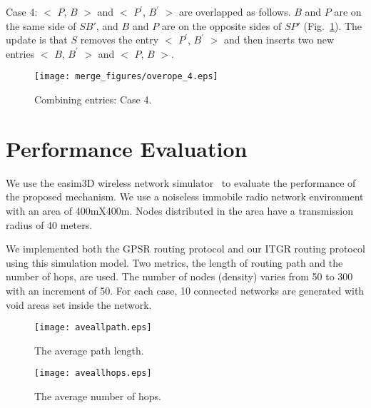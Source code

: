 \documentclass[3p,times]{elsarticle}
\begin{document}
Case 4: $<$ $P$, $B$ $>$ and $<$ $P^{'}$, $B^{'}$ $>$ are overlapped as follows. $B$ and $P$ are on the
same side of $SB'$,
and $B$ and $P$ are on the opposite sides of $SP'$ (Fig.~\ref{fig3_14}).
The update is that
$S$ removes the entry $<$ $P^{'}$, $B^{'}$ $>$ and then inserts two new entries $<$ $B$, $B^{'}$ $>$ and $<$ $P$, $B$ $>$.

\begin{figure}[!htp]
\begin{center}
\texttt{[image: merge\_figures/overope\_4.eps]}
\end{center}
\caption{Combining entries: Case 4.}
\label{fig3_14}
\end{figure}




\section{Performance Evaluation}
\label{evaluation}




We use the easim3D wireless network simulator~\cite{ex27} to evaluate the performance of the proposed mechanism.
We use a noiseless immobile radio network environment with an area of 400mX400m.
Nodes distributed in the area have a transmission radius of 40 meters.

We implemented both the GPSR routing protocol and our ITGR routing protocol using this simulation model.
Two metrics, the length of routing path and the number of hops, are used.
The number of nodes (density) varies from 50 to 300
with an increment of 50. For each case,
10 connected networks are generated with void areas set
inside the network.



\begin{figure}[hb]
\begin{center}
\texttt{[image: aveallpath.eps]}
\end{center}
\caption{The average path length.}
\label{fig15}
\end{figure}


\begin{figure}
\begin{center}
\texttt{[image: aveallhops.eps]}
\end{center}
\caption{The average number of hops.}
\label{fig16}
\end{figure}
\end{document}
